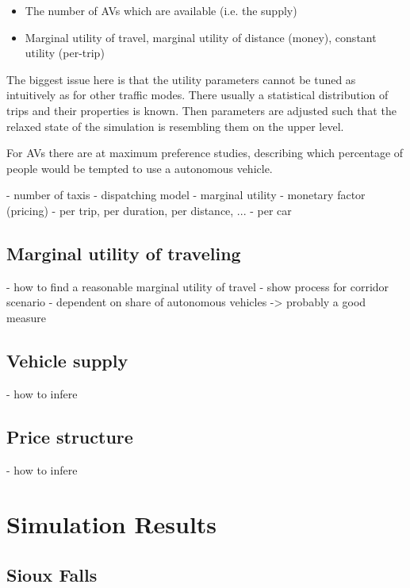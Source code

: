 \documentclass[10pt,a4paper,draft]{report}
\begin{document}
\begin{itemize}
\item The number of AVs which are available (i.e. the supply)
\item Marginal utility of travel, marginal utility of distance (money), constant utility (per-trip)
\end{itemize}

The biggest issue here is that the utility parameters cannot be tuned as intuitively as for other traffic modes. There usually a statistical distribution of trips and their properties is known. Then parameters are adjusted such that the relaxed state of the simulation is resembling them on the upper level.

For AVs there are at maximum preference studies, describing which percentage of people would be tempted to use a autonomous vehicle.





- number of taxis
- dispatching model
- marginal utility
- monetary factor (pricing)
- per trip, per duration, per distance, ...
- per car

\section{Marginal utility of traveling}

- how to find a reasonable marginal utility of travel
- show process for corridor scenario
- dependent on share of autonomous vehicles -> probably a good measure

\section{Vehicle supply}

- how to infere

\section{Price structure}

- how to infere



\chapter{Simulation Results}

\section{Sioux Falls}
\end{document}
